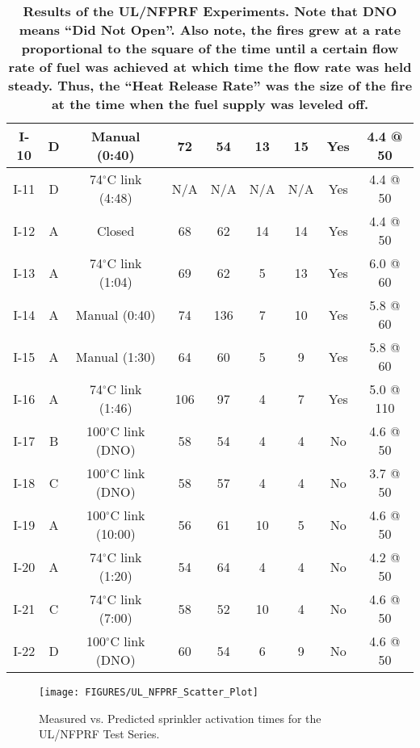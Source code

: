 \begin{table}[h]
\begin{center}
\begin{tabular}{|c||c|c|c|c|c|c|c|c|}
I-10  & D  & Manual (0:40)              & 72   & 54                             & 13   & 15     & Yes  & 4.4 @ 50  \\ \hline
I-11  & D  & 74$^\circ$C link (4:48)    & N/A  & N/A                            & N/A  & N/A    & Yes  & 4.4 @ 50  \\ \hline
I-12  & A  & Closed                     & 68   & 62                             & 14   & 14     & Yes  & 4.4 @ 50  \\ \hline
I-13  & A  & 74$^\circ$C link (1:04)    & 69   & 62                             & 5    & 13     & Yes  & 6.0 @ 60  \\ \hline
I-14  & A  & Manual (0:40)              & 74   & 136                            & 7    & 10     & Yes  & 5.8 @ 60  \\ \hline
I-15  & A  & Manual (1:30)              & 64   & 60                             & 5    & 9      & Yes  & 5.8 @ 60  \\ \hline
I-16  & A  & 74$^\circ$C link (1:46)    & 106  & 97                             & 4    & 7      & Yes  & 5.0 @ 110 \\ \hline
\hline
I-17  & B  & 100$^\circ$C link (DNO)    & 58   & 54                             & 4    & 4      & No   & 4.6 @ 50 \\ \hline
I-18  & C  & 100$^\circ$C link (DNO)    & 58   & 57                             & 4    & 4      & No   & 3.7 @ 50 \\ \hline
I-19  & A  & 100$^\circ$C link (10:00)  & 56   & 61                             & 10   & 5      & No   & 4.6 @ 50 \\ \hline
I-20  & A  & 74$^\circ$C link (1:20)    & 54   & 64                             & 4    & 4      & No   & 4.2 @ 50 \\ \hline
I-21  & C  & 74$^\circ$C link (7:00)    & 58   & 52                             & 10   & 4      & No   & 4.6 @ 50 \\ \hline
I-22  & D  & 100$^\circ$C link (DNO)    & 60   & 54                             & 6    & 9      & No   & 4.6 @ 50 \\ \hline
\end{tabular}
\end{center}
\caption[Results of the UL/NFPRF Experiments.]
{\bf Results of the UL/NFPRF Experiments. Note that DNO means
``Did Not Open''. Also note, the fires grew at a rate proportional
to the square of the time until a certain flow rate of fuel was achieved
at which time the flow rate was held steady. Thus, the ``Heat Release Rate''
was the size of the fire at the time when the fuel supply was leveled off.}
\label{ULmatrix}
\end{table}


\begin{figure}[ht]
\texttt{[image: FIGURES/UL\_NFPRF\_Scatter\_Plot]}
\caption{Measured vs. Predicted sprinkler activation times for the UL/NFPRF Test Series.}
\label{UL_NFPRF_Scatter_Plot}
\end{figure}

